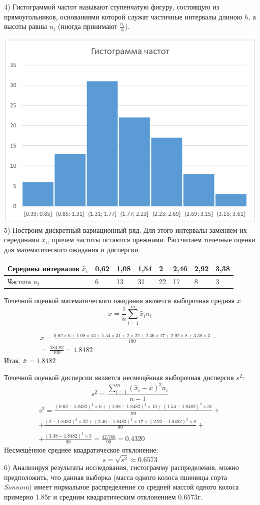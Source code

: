\documentclass[a4paper,12pt]{article} %
\begin{document}
4) Гистограммой частот называют ступенчатую фигуру, состоящую из
прямоугольников, основаниями которой служат частичные интервалы длиною $h$, а
высоты равны $n_i$ (иногда принимают $\frac{n_i}{h}$).

\includegraphics[width=0.9\linewidth]{hist.png}\\
5) Построим дискретный вариационный ряд. Для этого интервалы заменяем их серединами
$\tilde{x_i}$, причем частоты остаются прежними. Рассчитаем точечные оценки для математического ожидания и дисперсии.\\
\begin{tabular}{ | l | l | l | l | l | l | l | l | }
  \hline
  Середины интервалов $\tilde{x_i}$ & 0,62 & 1,08 & 1,54 & 2 & 2,46 & 2,92 & 3,38 \\ \hline
  Частота $n_i$ & 6 & 13 & 31 & 22 & 17 & 8 & 3 \\ \hline
\end{tabular}

Точечной оценкой математического ожидания является выборочная средняя $\bar{x}$
\[
  \bar{x} = \frac{1}{n}\sum_{i=1}^m\tilde{x_i}n_i
\]

\begin{multline}
  \bar{x} = \frac{0.62\times6+1.08\times13+1.54\times31+2\times22+2.46\times17+2.92\times8+3.38\times3}{100}=\\
  =\frac{184.82}{100}=1.8482
\end{multline}
Итак, $\bar{x}=1.8482$

Точечной оценкой дисперсии является несмещённая выборочная дисперсия $s^2$:
\[
  s^2 = \dfrac{\sum_{i=1}^m(\tilde{x_i} - \bar{x})^2n_i}{n-1}
\]
\begin{multline}
  s^2 = \frac{(0.62-1.8482)^2\times6
  + (1.08-1.8482)^2\times13+(1.54-1.8482)^2\times31}{99}+\\
  + \frac{(2-1.8482)^2\times22+(2.46-1.8482)^2\times17+(2.92-1.8482)^2\times8}{99}+\\
  +\frac{(3.38-1.8482)^2\times3}{99} =\frac{42.766}{99}=0.4320
\end{multline}
Несмещённое среднее квадратическое отклонение:
\[
  s= \sqrt{s^2} \approx 0.6573
\]
6) Анализируя результаты исследования, гистограмму распределения, можно
предположить, что данная выборка (масса одного колоса пшеницы сорта \textit{Sonnora})
имеет нормальное распределение со средней массой одного колоса примерно 1.85г
и средним квадратическим отклонением \(0.6573\)г.
\end{document}
